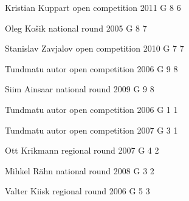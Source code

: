 \documentclass[11pt]{article}
\begin{document}
\ylDisplay{} %
{Kristian Kuppart} %
{open competition} %
{2011} %
{G 8} %
{6} %
{

\ifEngSolution
\fi
}

\ylDisplay{} %
{Oleg Košik} %
{national round} %
{2005} %
{G 8} %
{7} %
{

\ifEngSolution
\fi
}

\ylDisplay{} %
{Stanislav Zavjalov} %
{open competition} %
{2010} %
{G 7} %
{7} %
{

\ifEngSolution
\fi
}

\ylDisplay{} %
{Tundmatu autor} %
{open competition} %
{2006} %
{G 9} %
{8} %
{

\ifEngSolution
\fi
}

\ylDisplay{} %
{Siim Ainsaar} %
{national round} %
{2009} %
{G 9} %
{8} %
{

\ifEngSolution
\fi
}

\ylDisplay{} %
{Tundmatu autor} %
{open competition} %
{2006} %
{G 1} %
{1} %
{

\ifEngSolution
\fi
}

\ylDisplay{} %
{Tundmatu autor} %
{open competition} %
{2007} %
{G 3} %
{1} %
{

\ifEngSolution
\fi
}

\ylDisplay{} %
{Ott Krikmann} %
{regional round} %
{2007} %
{G 4} %
{2} %
{

\ifEngSolution
\fi
}

\ylDisplay{} %
{Mihkel Rähn} %
{national round} %
{2008} %
{G 3} %
{2} %
{

\ifEngSolution
\fi
}

\ylDisplay{} %
{Valter Kiisk} %
{regional round} %
{2006} %
{G 5} %
{3} %
{

\ifEngSolution
\fi
}
\end{document}
